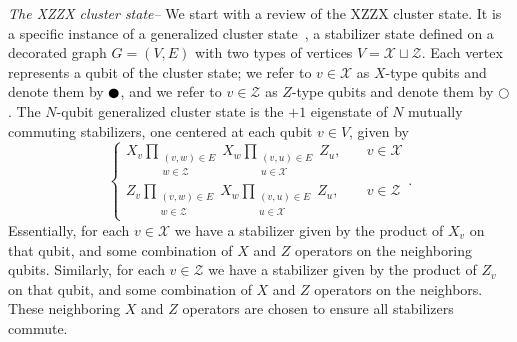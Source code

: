 \documentclass[reprint,
groupedaddress,
 prl,amsmath,amssymb,
 aps]{revtex4-2}
\theoremstyle{definition}
\begin{document}
\begin{bibunit}
{\it The XZZX cluster state--} We start with a review of the XZZX cluster state. It is a specific instance of a generalized cluster state~\cite{claes2022tailored}, a stabilizer state defined on a decorated graph $G=(V,E)$ with two types of vertices $V=\mathcal{X}\sqcup\mathcal{Z}$. Each vertex represents a qubit of the cluster state; we refer to $v\in\mathcal X$ as $X$-type qubits and denote them by $\newmoon$, and we refer to $v\in \mathcal Z$ as $Z$-type qubits and denote them by $\bigcirc$. The $N$-qubit generalized cluster state is the $+1$ eigenstate of $N$ mutually commuting stabilizers, one centered at each qubit $v\in V$, given by
\begin{equation}
 \left\{\begin{aligned}X_v\prod_{\substack{(v,w)\in E\\w\in\mathcal{Z}}}X_w\prod_{\substack{(v,u)\in E\\u\in\mathcal{X}}}Z_u, & \quad v\in \mathcal{X}\\
 Z_v\prod_{\substack{(v,w)\in E\\w\in\mathcal{Z}}}X_w\prod_{\substack{(v,u)\in E\\u\in\mathcal{X}}}Z_u, & \quad v\in \mathcal{Z} 
 \end{aligned}\right. .\label{eq:GeneralizedClusterStabilizers}
\end{equation}
Essentially, for each $v\in \mathcal{X}$ we have a stabilizer given by the product of $X_v$ on that qubit, and some combination of $X$ and $Z$ operators on the neighboring qubits. Similarly, for each $v\in \mathcal{Z}$ we have a stabilizer given by the product of $Z_v$ on that qubit, and some combination of $X$ and $Z$ operators on the neighbors. These neighboring $X$ and $Z$ operators are chosen to ensure all stabilizers commute. 



\end{bibunit}
\end{document}
